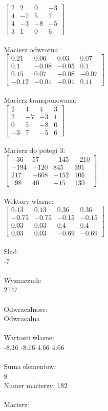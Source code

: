 \documentclass[a4paper,12pt]{article}
\begin{document}
$\begin{bmatrix} 2&2&0&-3\\4&-7&5&7\\4&-3&-8&-5\\3&1&0&6 \end{bmatrix}$
\\
\\
Macierz odwrotna:\\

$\begin{bmatrix} 0.21&0.06&0.03&0.07\\0.1&-0.08&-0.05&0.1\\0.15&0.07&-0.08&-0.07\\-0.12&-0.01&-0.01&0.11 \end{bmatrix}$
\\
\\
Macierz transponowana:\\

$\begin{bmatrix} 2&4&4&3\\2&-7&-3&1\\0&5&-8&0\\-3&7&-5&6 \end{bmatrix}$
\\
\\
Macierz do potegi 3:\\

$\begin{bmatrix} -36&57&-145&-210\\-194&-120&845&391\\217&-608&-152&106\\198&40&-15&130 \end{bmatrix}$
\\
\\
Wektory wlasne:\\

$\begin{bmatrix} 0.13&0.13&0.36&0.36\\-0.75&-0.75&-0.15&-0.15\\0.03&0.03&0.4&0.4\\0.03&0.03&-0.69&-0.69 \end{bmatrix}$
\\
\\
Slad:\\
-7
\\
\\
Wyznacznik:\\
2147
\\
\\
Odwracalnosc:\\
Odwracalna
\\
\\
Wartosci wlasne:\\
-8.16 -8.16 4.66 4.66
\\
\\
Suma elementow:\\
8
\\
\newpage
Numer macierzy:
182
\\
\\
Macierz:\\
\end{document}
